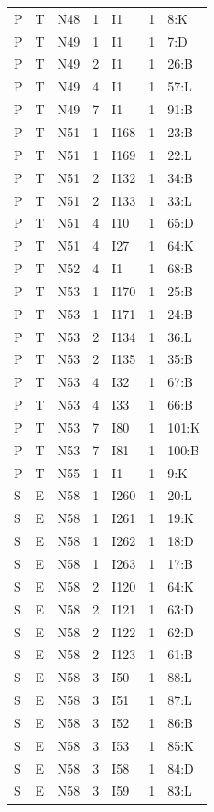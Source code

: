 {\begin{longtable}{lllrlrp{.35\linewidth}}
P & T & N48 & 1 & I1 & 1 & 8:K \\
P & T & N49 & 1 & I1 & 1 & 7:D \\
P & T & N49 & 2 & I1 & 1 & 26:B \\
P & T & N49 & 4 & I1 & 1 & 57:L \\
P & T & N49 & 7 & I1 & 1 & 91:B \\
P & T & N51 & 1 & I168 & 1 & 23:B \\
P & T & N51 & 1 & I169 & 1 & 22:L \\
P & T & N51 & 2 & I132 & 1 & 34:B \\
P & T & N51 & 2 & I133 & 1 & 33:L \\
P & T & N51 & 4 & I10 & 1 & 65:D \\
P & T & N51 & 4 & I27 & 1 & 64:K \\
P & T & N52 & 4 & I1 & 1 & 68:B \\
P & T & N53 & 1 & I170 & 1 & 25:B \\
P & T & N53 & 1 & I171 & 1 & 24:B \\
P & T & N53 & 2 & I134 & 1 & 36:L \\
P & T & N53 & 2 & I135 & 1 & 35:B \\
P & T & N53 & 4 & I32 & 1 & 67:B \\
P & T & N53 & 4 & I33 & 1 & 66:B \\
P & T & N53 & 7 & I80 & 1 & 101:K \\
P & T & N53 & 7 & I81 & 1 & 100:B \\
P & T & N55 & 1 & I1 & 1 & 9:K \\
S & E & N58 & 1 & I260 & 1 & 20:L \\
S & E & N58 & 1 & I261 & 1 & 19:K \\
S & E & N58 & 1 & I262 & 1 & 18:D \\
S & E & N58 & 1 & I263 & 1 & 17:B \\
S & E & N58 & 2 & I120 & 1 & 64:K \\
S & E & N58 & 2 & I121 & 1 & 63:D \\
S & E & N58 & 2 & I122 & 1 & 62:D \\
S & E & N58 & 2 & I123 & 1 & 61:B \\
S & E & N58 & 3 & I50 & 1 & 88:L \\
S & E & N58 & 3 & I51 & 1 & 87:L \\
S & E & N58 & 3 & I52 & 1 & 86:B \\
S & E & N58 & 3 & I53 & 1 & 85:K \\
S & E & N58 & 3 & I58 & 1 & 84:D \\
S & E & N58 & 3 & I59 & 1 & 83:L \\

\end{longtable}}
